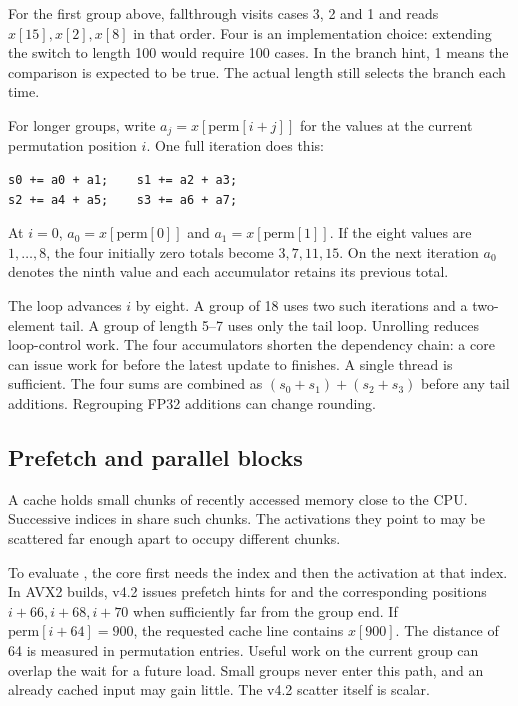 \documentclass[11pt,a4paper]{article}
\newcommand{\code}[1]{\texttt{\detokenize{#1}}}
\begin{document}
For the first group above, fallthrough visits cases 3, 2 and 1 and
reads \(x[15],x[2],x[8]\) in that order. Four is an implementation
choice: extending the switch to length 100 would require 100 cases.
In the branch hint, 1 means the comparison is expected to be true.
The actual length still selects the branch each time.

For longer groups, write \(a_j=x[\mathrm{perm}[i+j]]\) for the values at
the current permutation position \(i\). One full iteration does this:
\begin{lstlisting}
s0 += a0 + a1;    s1 += a2 + a3;
s2 += a4 + a5;    s3 += a6 + a7;
\end{lstlisting}
At \(i=0\), \(a_0=x[\mathrm{perm}[0]]\) and
\(a_1=x[\mathrm{perm}[1]]\). If the eight values are \(1,\ldots,8\),
the four initially zero totals become \(3,7,11,15\). On the next
iteration \(a_0\) denotes the ninth value and each accumulator retains
its previous total.

The loop advances \(i\) by eight. A group of 18 uses two such iterations
and a two-element tail. A group of length 5--7 uses only the tail loop.
Unrolling reduces loop-control work. The four accumulators shorten the
dependency chain: a core can issue work for \code{s1} before the latest
update to \code{s0} finishes. A single thread is sufficient. The four
sums are combined as \((s_0+s_1)+(s_2+s_3)\) before any tail additions.
Regrouping FP32 additions can change rounding.

\subsection{Prefetch and parallel blocks}
A cache holds small chunks of recently accessed memory close to the CPU.
Successive indices in \code{perm} share such chunks. The activations they
point to may be scattered far enough apart to occupy different chunks.

To evaluate \code{x[perm[i]]}, the core first needs the index and then the
activation at that index. In AVX2 builds, v4.2 issues prefetch hints for
\code{x[perm[i+64]]} and the corresponding positions \(i+66,i+68,i+70\)
when sufficiently far from the group end. If \(\mathrm{perm}[i+64]=900\),
the requested cache line contains \(x[900]\). The distance of 64 is measured
in permutation entries. Useful work on the current group can overlap the
wait for a future load. Small groups never enter this path, and an already
cached input may gain little. The v4.2 scatter itself is scalar.
\end{document}
